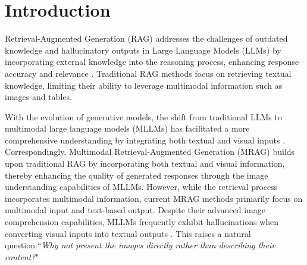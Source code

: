 

\section{Introduction}
\label{sec:intro}
Retrieval-Augmented Generation (RAG) addresses the challenges of outdated knowledge and hallucinatory outputs in Large Language Models (LLMs) by incorporating external knowledge into the reasoning process, enhancing response accuracy and relevance  \citep{hallucination, gupta2024rag}. Traditional RAG methods focus on retrieving textual knowledge, limiting their ability to leverage multimodal information such as images and tables.

With the evolution of generative models, the shift from traditional LLMs to multimodal large language models (MLLMs) has facilitated a more comprehensive 
understanding by integrating both textual and visual inputs \citep{wang2024comprehensive,wang2024qwen2}. 
Correspondingly, Multimodal Retrieval-Augmented Generation (MRAG) \citep{chen2022murag} builds upon traditional RAG by incorporating both textual and visual information, thereby enhancing the quality of generated responses through the image understanding capabilities of MLLMs.
However, while the retrieval process incorporates multimodal information, current MRAG methods primarily focus on multimodal input and text-based output. 
Despite their advanced image comprehension capabilities, MLLMs frequently exhibit hallucinations when converting visual inputs into textual outputs \citep{bai2024hallucination}. 
This raises a natural question:``\textit{Why not present the images directly rather than describing their content?}"

